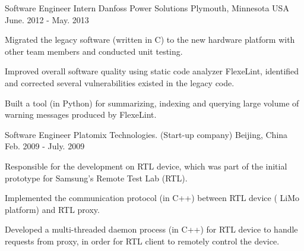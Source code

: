 

\begin{cventries}

  \cventry
    {Software Engineer Intern} %
    {Danfoss Power Solutions} %
    {Plymouth, Minnesota USA} %
    {June. 2012 - May. 2013} %
    {
      \begin{cvitems} %
        \item {Migrated the legacy software (written in C) to the new hardware
    platform with other team members and conducted unit testing.}
       \item {Improved overall software quality using static code analyzer FlexeLint, identified
    and corrected several vulnerabilities existed in the legacy code.}
           \item {Built a tool (in Python) for summarizing, indexing and
    querying large volume of warning messages produced by FlexeLint.}
      \end{cvitems}
    }

  \cventry
    {Software Engineer} %
    {Platomix Technologies. (Start-up company)} %
    {Beijing, China} %
    {Feb. 2009 - July. 2009} %
    {
      \begin{cvitems} %
       \item {Responsible for the
    development on RTL device, which was part of the initial prototype for
    Samsung's Remote Test Lab (RTL).}
       \item {Implemented the communication protocol (in C++) between RTL device (
    LiMo platform) and RTL proxy.}
       \item {Developed a multi-threaded daemon process (in C++) for RTL
    device to handle requests from proxy, in order for RTL client
    to remotely control the device.}
      \end{cvitems}
    }


\end{cventries}
